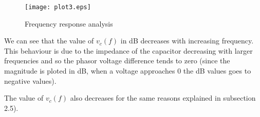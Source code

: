 \begin{figure}[ht]
	\centering
	\texttt{[image: plot3.eps]}
	\caption{Frequency response analysis}
\label{fig:Dsnh_sim_t2}
\end{figure}

We can see that the value of $v_c(f)$ in dB decreases with increasing frequency. This behaviour is due to the impedance of the capacitor decreasing with larger frequencies and so the phasor voltage difference tends to zero (since the magnitude is ploted in dB, when a voltage approaches 0 the dB values goes to negative values).

The value of $v_c(f)$ also decreases for the same reasons explained in subsection 2.5).






